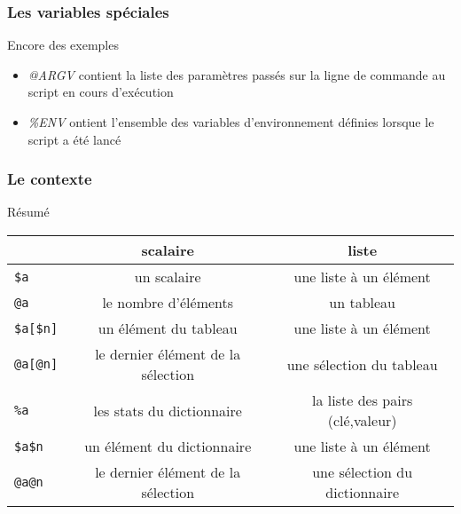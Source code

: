 \begin{frame}[fragile]
  \frametitle{Les variables spéciales}

  \begin{exampleblock}{Encore des exemples}
    \begin{itemize}
    \item \textit{@ARGV} contient la liste des paramètres passés sur la
      ligne de commande au script en cours d'exécution
    \item \textit{\%ENV} ontient l'ensemble des variables d'environnement
      définies lorsque le script a été lancé
    \end{itemize}
  \end{exampleblock}

\end{frame}

\begin{frame}[fragile]
  \frametitle{Le contexte}

  \begin{alertblock}{Résumé}
    \begin{center}
      \begin{tabular}{l!{\vrule}cc}
        & \textbf{scalaire} & \textbf{liste}\\\hline
        \texttt{\$a}      & un scalaire           & une liste à un élément \\
        \texttt{@a}       & le nombre d'éléments  & un tableau \\
        \texttt{\$a[\$n]} & un élément du tableau & une liste à un élément \\
        \texttt{@a[@n]}   & le dernier élément de la sélection & une sélection du tableau \\
        \texttt{\%a}      & les stats du dictionnaire & la liste des pairs (clé,valeur) \\
        \texttt{\$a{\$n}} & un élément du dictionnaire & une liste à un élément\\
        \texttt{@a{@n}}   & le dernier élément de la sélection & une sélection du dictionnaire \\
      \end{tabular}
    \end{center}
  \end{alertblock}

\end{frame}

